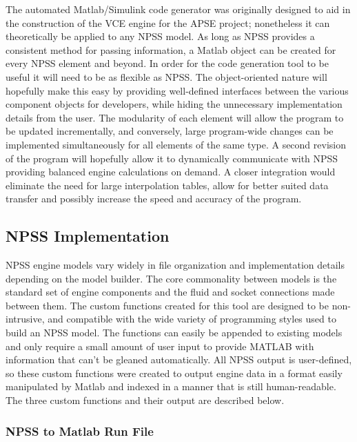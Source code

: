 \documentclass[heading.tex]{subfiles}
\begin{document}
The automated Matlab/Simulink code generator was originally designed to aid in the construction of the VCE engine for the APSE project; nonetheless it can theoretically be applied to any NPSS model. As long as NPSS provides a consistent method for passing information, a Matlab object can be created for every NPSS element and beyond. In order for the code generation tool to be useful it will need to be as flexible as NPSS. The object-oriented nature will hopefully make this easy by providing well-defined interfaces between the various component objects for developers, while hiding the unnecessary implementation details from the user. The modularity of each element will allow the program to be updated incrementally, and conversely, large program-wide changes can be implemented simultaneously for all elements of the same type. 
	A second revision of the program will hopefully allow it to dynamically communicate with NPSS providing balanced engine calculations on demand. A closer integration would eliminate the need for large interpolation tables, allow for better suited data transfer and possibly increase the speed and accuracy of the program.

\subsection{NPSS Implementation}

NPSS engine models vary widely in file organization and implementation details depending on the model builder. The core commonality between models is the standard set of engine components and the fluid and socket connections made between them. The custom functions created for this tool are designed to be non-intrusive, and compatible with the wide variety of programming styles used to build an NPSS model. The functions can easily be appended to existing models and only require a small amount of user input to provide MATLAB with information that can’t be gleaned automatically. All NPSS output is user-defined, so these custom functions were created to output engine data in a format easily manipulated by Matlab and indexed in a manner that is still human-readable. The three custom functions and their output are described below.

\subsubsection{NPSS to Matlab Run File}
\end{document}
